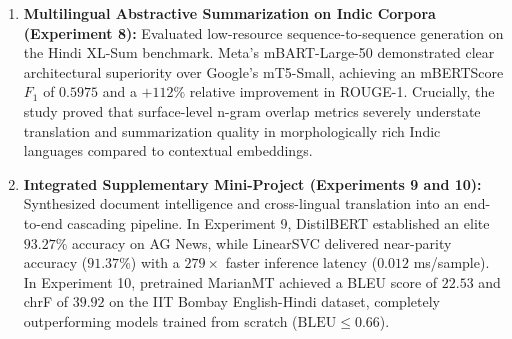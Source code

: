 \documentclass[12pt,a4paper]{report}
\begin{document}
\begin{enumerate}
    \item \textbf{Multilingual Abstractive Summarization on Indic Corpora (Experiment 8):} Evaluated low-resource sequence-to-sequence generation on the Hindi XL-Sum benchmark. Meta's mBART-Large-50 demonstrated clear architectural superiority over Google's mT5-Small, achieving an mBERTScore $F_1$ of $\mathbf{0.5975}$ and a $+112\%$ relative improvement in ROUGE-1. Crucially, the study proved that surface-level n-gram overlap metrics severely understate translation and summarization quality in morphologically rich Indic languages compared to contextual embeddings.
    \item \textbf{Integrated Supplementary Mini-Project (Experiments 9 and 10):} Synthesized document intelligence and cross-lingual translation into an end-to-end cascading pipeline. In Experiment 9, DistilBERT established an elite $\mathbf{93.27\%}$ accuracy on AG News, while LinearSVC delivered near-parity accuracy ($\mathbf{91.37\%}$) with a $279\times$ faster inference latency ($0.012$ ms/sample). In Experiment 10, pretrained MarianMT achieved a BLEU score of $\mathbf{22.53}$ and chrF of $\mathbf{39.92}$ on the IIT Bombay English-Hindi dataset, completely outperforming models trained from scratch ($\text{BLEU} \le 0.66$).
\end{enumerate}
\end{document}
